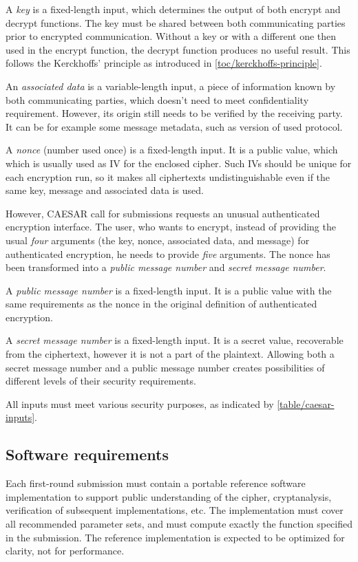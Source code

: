 A \textit{key} is a fixed-length input, which determines the output of both encrypt and decrypt functions. The key must be shared between both communicating parties prior to encrypted communication. Without a key or with a different one then used in the encrypt function, the decrypt function produces no useful result. This follows the Kerckhoffs' principle as introduced in \autoref{toc/kerckhoffs-principle}.

An \textit{associated data} is a variable-length input, a piece of information known by both communicating parties, which doesn't need to meet confidentiality requirement. However, its origin still needs to be verified by the receiving party. It can be for example some message metadata, such as version of used protocol.

A \textit{nonce} (number used once) is a fixed-length input. It is a public value, which which is usually used as IV for the enclosed cipher. Such IVs should be unique for each encryption run, so it makes all ciphertexts undistinguishable even if the same key, message and associated data is used.

However, CAESAR call for submissions requests an unusual authenticated encryption interface. The user, who wants to encrypt, instead of providing the usual \textit{four} arguments (the key, nonce, associated data, and message) for authenticated encryption, he needs to provide \textit{five} arguments. The nonce has been transformed into a \textit{public message number} and \textit{secret message number}. \cite{cryptoeprint:2013:242}

A \textit{public message number} is a fixed-length input. It is a public value with the same requirements as the nonce in the original definition of authenticated encryption.

A \textit{secret message number} is a fixed-length input. It is a secret value, recoverable from the ciphertext, however it is not a part of the plaintext. Allowing both a secret message number and a public message number creates possibilities of different levels of their security requirements.

All inputs must meet various security purposes, as indicated by \autoref{table/caesar-inputs}.


\subsection{Software requirements}
\label{toc/caesar-api}

Each first-round submission must contain a portable reference software implementation to support public understanding of the cipher, cryptanalysis, verification of subsequent implementations, etc. The implementation must cover all recommended parameter sets, and must compute exactly the function specified in the submission. The reference implementation is expected to be optimized for clarity, not for performance. \cite{crypto-competitions}

